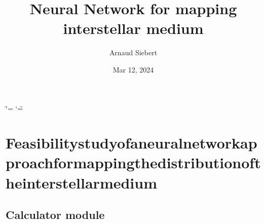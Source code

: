 \documentclass[letterpaper,10pt,english]{sphinxmanual}
\title{Neural Network for mapping interstellar medium}
\date{Mar 12, 2024}
\author{Arnaud Siebert}
\begin{document}
\ifdefined\shorthandoff
  \ifnum\catcode`\=\string=\active\shorthandoff{=}\fi
  \ifnum\catcode`\"=\active{}\fi
\fi

\pagestyle{empty}
\sphinxmaketitle
\pagestyle{plain}
\sphinxtableofcontents
\pagestyle{normal}
\label{\detokenize{index::doc}}


\sphinxstepscope


\chapter{Feasibility\sphinxhyphen{}study\sphinxhyphen{}of\sphinxhyphen{}a\sphinxhyphen{}neural\sphinxhyphen{}network\sphinxhyphen{}approach\sphinxhyphen{}for\sphinxhyphen{}mapping\sphinxhyphen{}the\sphinxhyphen{}distribution\sphinxhyphen{}of\sphinxhyphen{}the\sphinxhyphen{}interstellar\sphinxhyphen{}medium}
\label{\detokenize{modules:feasibility-study-of-a-neural-network-approach-for-mapping-the-distribution-of-the-interstellar-medium}}\label{\detokenize{modules::doc}}
\sphinxstepscope


\section{Calculator module}
\label{\detokenize{Calculator:module-Calculator}}\label{\detokenize{Calculator:calculator-module}}\label{\detokenize{Calculator::doc}}
\end{document}
